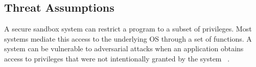 

\subsection{Threat Assumptions}


A secure sandbox system can restrict a program to a subset of privileges.
Most systems mediate this access to the underlying OS through a set of functions.
A system can be vulnerable to adversarial attacks
when an application obtains access to privileges that were not intentionally
 granted by the system ~\cite{Repy-10}.

